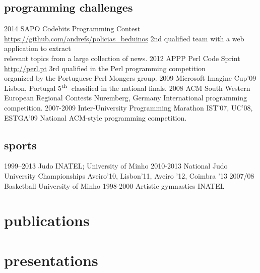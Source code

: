 \documentclass[a4paper]{friggeri-cv}
\begin{document}
\subsection{programming challenges}{}
\begin{entrylist}
  \entry
    {2014}
    {SAPO Codebits Programming Contest}
    {\href{https://github.com/andrefs/policias\_beduinos}{https://github.com/andrefs/policias\_beduinos}}
    {2nd qualified team with a web application to extract\\
    relevant topics from a large collection of news.}
  \entry
    {2012}
    {APPP Perl Code Sprint}
    {\href{http://perl.pt}{http://perl.pt}}
    {3rd qualified in the Perl programming competition\\organized by the Portuguese Perl Mongers group.}
  \entry
    {2009}
    {Microsoft Imagine Cup'09}
    {Lisbon, Portugal}
    {5$^{\footnotesize\textrm{th}}$~classified in the national finals.}
  \entry
    {2008}
    {ACM South Western European Regional Contests}
    {Nuremberg, Germany}
    {International programming competition.}
  \entry
    {2007-2009}
    {Inter-University Programming Marathon}
    {IST'07, UC'08, ESTGA'09}
    {National ACM-style programming competition.}
\end{entrylist}

\subsection{sports}{}
\begin{entrylist}
  \entry
    {1999--2013}
    {Judo}
    {INATEL; University of Minho}
    {\vspace{-.8cm}}
  \entry
    {2010-2013}
    {National Judo University Championships}
    {Aveiro'10, Lisbon'11, Aveiro '12, Coimbra '13}
    {\vspace{-.8cm}}
  \entry
    {2007/08}
    {Basketball}
    {University of Minho}
    {\vspace{-.8cm}}
  \entry
    {1998-2000}
    {Artistic gymnastics}
    {INATEL}
    {}
\end{entrylist}

\newpage
\section{publications}

\begin{refsection}
  \nocite{*}
  \printbibliography[type=inproceedings, title={peer-reviewed conferences/proceedings}, heading=subbibliography]
\end{refsection}


\section{presentations}
\begin{refsection}
  \nocite{*}
  \printbibliography[type=misc, title={presentations}, heading=none]
\end{refsection}
\end{document}

